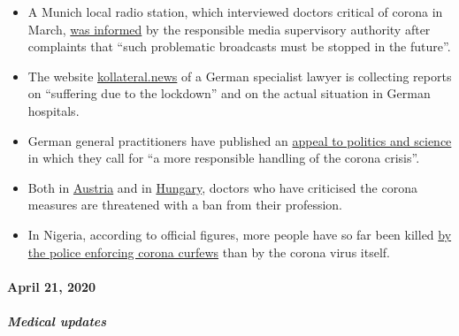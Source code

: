 \begin{itemize}
\item
  A Munich local radio station, which interviewed doctors critical of
  corona in March,
  \href{https://norberthaering.de/medienversagen/radiomuenchen-blm-meinungsvielfalt/}{was
  informed} by the responsible media supervisory authority after
  complaints that ``such problematic broadcasts must be stopped in the
  future''.
\item
  The website \href{https://kollateral.news/}{kollateral.news} of a
  German specialist lawyer is collecting reports on ``suffering due to
  the lockdown'' and on the actual situation in German hospitals.
\item
  German general practitioners have published an
  \href{https://aerzteinnenvorort.de/der-appell}{appeal to politics and
  science} in which they call for ``a more responsible handling of the
  corona crisis''.
\item
  Both in
  \href{https://www.sn.at/panorama/oesterreich/arzt-droht-berufsverbot-wegen-kritik-an-corona-massnahmen-86594140}{Austria}
  and in
  \href{https://magyarhang.org/belfold/2020/04/16/etikai-vizsgalat-indul-az-orvos-ellen-aki-szerint-nincs-jarvany-es-az-idosek-csak-a-felelemtol-halnak-meg/}{Hungary},
  doctors who have criticised the corona measures are threatened with a
  ban from their profession.
\item
  In Nigeria, according to official figures, more people have so far
  been killed \href{https://www.bbc.com/news/world-africa-52317196}{by
  the police enforcing corona curfews} than by the corona virus itself.
\end{itemize}

\hypertarget{april-21-2020}{%
\paragraph{April 21, 2020}\label{april-21-2020}}

\hypertarget{medical-updates-1}{%
\subparagraph{\texorpdfstring{\textbf{Medical
updates}}{Medical updates}}\label{medical-updates-1}}

